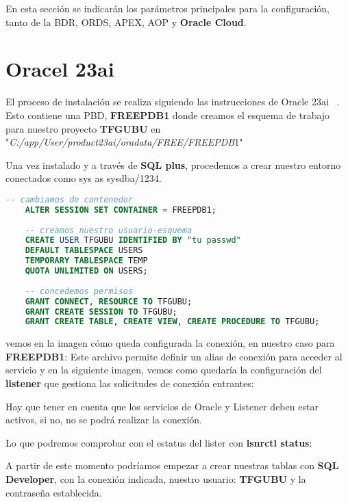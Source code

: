 
En esta sección se indicarán los parámetros principales para la configuración, tanto de la \acrshort{BDR}, \acrshort{ORDS}, \acrshort{APEX}, \acrshort{AOP} y \textbf{Oracle Cloud}.

\section{Oracel 23ai}
El proceso de instalación se realiza siguiendo las instrucciones de Oracle 23ai ~\cite{DattaInstallingOracleDatabasea}.
Esto contiene una \acrfull{PBD}, \textbf{\textbf{FREEPDB1}} donde creamos el esquema de trabajo para nuestro proyecto \textbf{TFGUBU} en "\textit{C:/app/User/product23ai/oradata/FREE/FREEPDB}1"

Una vez instalado y a través de \textbf{SQL plus}, procedemos a crear nuestro entorno conectados como sys as sysdba/1234.
\begin{lstlisting}[language=SQL, caption={Creación de Esquema TFGUBU}]
	-- cambiamos de contenedor
	ALTER SESSION SET CONTAINER = FREEPDB1;
	
	-- creamos nuestro usuario-esquema
	CREATE USER TFGUBU IDENTIFIED BY "tu passwd"
	DEFAULT TABLESPACE USERS
	TEMPORARY TABLESPACE TEMP
	QUOTA UNLIMITED ON USERS;
	
	-- concedemos permisos
	GRANT CONNECT, RESOURCE TO TFGUBU;
	GRANT CREATE SESSION TO TFGUBU;
	GRANT CREATE TABLE, CREATE VIEW, CREATE PROCEDURE TO TFGUBU;
\end{lstlisting}

vemos en la imagen cómo queda configurada la conexión, en nuestro caso para \textbf{FREEPDB1}:
Este archivo permite definir un alias de conexión para acceder al servicio y en la siguiente imagen, vemos como quedaría la configuración del \textbf{listener} que gestiona las solicitudes de conexión entrantes:

Hay que tener en cuenta que los servicios de Oracle y Listener deben estar activos, si no, no se podrá realizar la conexión.


Lo que podremos comprobar con el estatus del lister con \textbf{lsnrctl status}:


A partir de este momento podríamos empezar a crear nuestras tablas con \textbf{SQL Developer}, con la conexión indicada, nuestro usuario: \textbf{TFGUBU} y la contraseña establecida.

